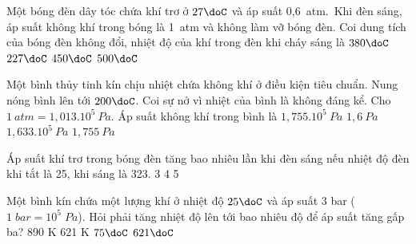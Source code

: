 \begin{vidu} %
	Một bóng đèn dây tóc chứa khí trơ ở $27\doC$ và áp suất 0,6\ atm.\ Khi đèn sáng, áp suất không khí trong bóng là 1\ atm và không làm vỡ bóng đèn. Coi dung tích của bóng đèn không đổi, nhiệt độ của khí trong đèn khi cháy sáng là
	\choice
	{$380\doC$}
	{\True $227\doC$}
	{$450\doC$}
	{$500\doC$}
	
\end{vidu}
\begin{vidu} %
	Một bình thủy tinh kín chịu nhiệt chứa không khí ở điều kiện tiêu chuẩn. Nung nóng bình lên tới $200\doC$. Coi sự nở vì nhiệt của bình là không đáng kể. Cho $1\ atm = 1,013.10^5\ Pa$. Áp suất không khí trong bình là
	\choice
	{\True $1,755.10^5\ Pa$}
	{$1,6\ Pa$}
	{$1,633.10^5\ Pa$}
	{$1,755\ Pa$}
\end{vidu}
\begin{vidu}%
	Áp suất khí trơ trong bóng đèn tăng bao nhiêu lần khi đèn sáng nếu nhiệt độ đèn khi tắt là 25\doC, khi sáng là 323\doC.
	\choice
	{}
	{3}
	{4}
	{5}
\end{vidu}
\begin{vidu}%
	Một bình kín chứa một lượng khí ở nhiệt độ $25\doC$ và áp suất 3 bar ($1\;bar = 10^5\;Pa$). Hỏi phải tăng nhiệt độ lên tới bao nhiêu độ để áp suất tăng gấp ba?
	\choice
	{890 K}
	{621 K}
	{$75\doC$}
	{\True $621\doC$}
\end{vidu}
